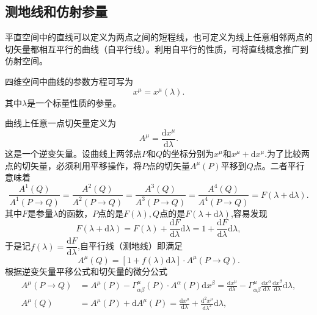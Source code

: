 \documentclass[11pt, a4paper, oneside, onecolumn]{ctexart}
\numberwithin{equation}{subsection}
\begin{document}
\subsection{测地线和仿射参量}
平直空间中的直线可以定义为两点之间的短程线，也可定义为线上任意相邻两点的切矢量都相互平行的曲线（自平行线）。利用自平行的性质，可将直线概念推广到仿射空间。

四维空间中曲线的参数方程可写为
\begin{equation}
x^{\mu}=x^{\mu}\left(\lambda\right).
\end{equation}
其中$\lambda$是一个标量性质的参量。

曲线上任意一点切矢量定义为
\begin{equation}
A^{\mu}=\frac{\mathrm{d}x^{\mu}}{\mathrm{d}\lambda}.
\end{equation}
这是一个逆变矢量。设曲线上两邻点$P$和$Q$的坐标分别为$x^{\mu}$和$x^{\mu}+\mathrm{d}x^{\mu}$.为了比较两点的切矢量，必须利用平移操作，将$P$点的切矢量$A^{\mu}\left(P\right)$平移到$Q$点。二者平行意味着
\begin{equation}
\frac{A^{1}\left(Q\right)}{A^{1}\left(P\to Q\right)}=\frac{A^{2}\left(Q\right)}{A^{2}\left(P\to Q\right)}=\frac{A^{3}\left(Q\right)}{A^{3}\left(P\to Q\right)}=\frac{A^{4}\left(Q\right)}{A^{4}\left(P\to Q\right)}=F\left(\lambda+\mathrm{d}\lambda\right).
\end{equation}
其中$F$是参量$\lambda$的函数，$P$点的是$F\left(\lambda\right),Q$点的是$F\left(\lambda+\mathrm{d}\lambda\right)$,容易发现
\begin{equation}
F\left(\lambda+\mathrm{d}\lambda\right)=F\left(\lambda\right)+\frac{\mathrm{d}F}{\mathrm{d}\lambda}\mathrm{d}\lambda=1+\frac{\mathrm{d}F}{\mathrm{d}\lambda}\mathrm{d}\lambda,
\end{equation}
于是记$f\left(\lambda\right)=\dfrac{\mathrm{d}F}{\mathrm{d}\lambda}$,自平行线（测地线）即满足
\begin{equation}
A^{\mu}\left(Q\right)=\left[1+f\left(\lambda\right)\mathrm{d}\lambda\right]\cdot A^{\mu}\left(P\to Q\right).
\end{equation}
根据逆变矢量平移公式和切矢量的微分公式
\begin{align}
A^{\mu}\left(P\to Q\right)&=A^{\mu}\left(P\right)-\Gamma_{\alpha\beta}^{\mu}\left(P\right)\cdot A^{\alpha}\left(P\right)\mathrm{d}x^{\beta}=\frac{\mathrm{d}x^{\mu}}{\mathrm{d}\lambda}-\Gamma_{\alpha\beta}^{\mu}\frac{\mathrm{d}x^{\alpha}}{\mathrm{d}\lambda}\frac{\mathrm{d}x^{\beta}}{\mathrm{d}\lambda}\mathrm{d}\lambda,\\
A^{\mu}\left(Q\right)&=A^{\mu}\left(P\right)+\mathrm{d}A^{\mu}\left(P\right)=\frac{\mathrm{d}x^{\mu}}{\mathrm{d}\lambda}+\frac{\mathrm{d}^{2}x^{\mu}}{\mathrm{d}\lambda^{2}}\mathrm{d}\lambda,
\end{align}
\end{document}
